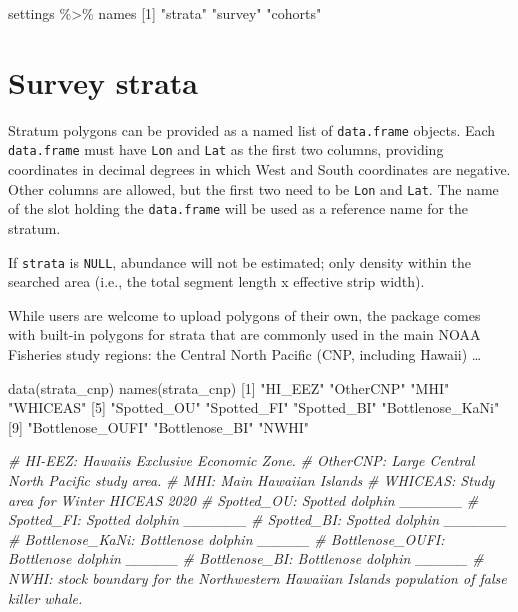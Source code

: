 \documentclass[
]{book}
\newenvironment{Shaded}{\begin{snugshade}}{\end{snugshade}}
\newcommand{\CommentTok}[1]{\textcolor[rgb]{0.56,0.35,0.01}{\textit{#1}}}
\newcommand{\DecValTok}[1]{\textcolor[rgb]{0.00,0.00,0.81}{#1}}
\newcommand{\FunctionTok}[1]{\textcolor[rgb]{0.00,0.00,0.00}{#1}}
\newcommand{\NormalTok}[1]{#1}
\newcommand{\SpecialCharTok}[1]{\textcolor[rgb]{0.00,0.00,0.00}{#1}}
\newcommand{\StringTok}[1]{\textcolor[rgb]{0.31,0.60,0.02}{#1}}
\begin{document}
\begin{Shaded}
\begin{Highlighting}[]
\NormalTok{settings }\SpecialCharTok{\%\textgreater{}\%}\NormalTok{ names}
\NormalTok{[}\DecValTok{1}\NormalTok{] }\StringTok{"strata"}  \StringTok{"survey"}  \StringTok{"cohorts"}
\end{Highlighting}
\end{Shaded}

\hypertarget{survey-strata}{%
\section*{Survey strata}\label{survey-strata}}

Stratum polygons can be provided as a named list of \texttt{data.frame} objects. Each \texttt{data.frame} must have \texttt{Lon} and \texttt{Lat} as the first two columns, providing coordinates in decimal degrees in which West and South coordinates are negative. Other columns are allowed, but the first two need to be \texttt{Lon} and \texttt{Lat}. The name of the slot holding the \texttt{data.frame} will be used as a reference name for the stratum.

If \texttt{strata} is \texttt{NULL}, abundance will not be estimated; only density within the searched area (i.e., the total segment length x effective strip width).

While users are welcome to upload polygons of their own, the package comes with built-in polygons for strata that are commonly used in the main NOAA Fisheries study regions: the Central North Pacific (CNP, including Hawaii) \ldots{}

\begin{Shaded}
\begin{Highlighting}[]
\FunctionTok{data}\NormalTok{(strata\_cnp) }
\FunctionTok{names}\NormalTok{(strata\_cnp)}
\NormalTok{ [}\DecValTok{1}\NormalTok{] }\StringTok{"HI\_EEZ"}          \StringTok{"OtherCNP"}        \StringTok{"MHI"}             \StringTok{"WHICEAS"}        
\NormalTok{ [}\DecValTok{5}\NormalTok{] }\StringTok{"Spotted\_OU"}      \StringTok{"Spotted\_FI"}      \StringTok{"Spotted\_BI"}      \StringTok{"Bottlenose\_KaNi"}
\NormalTok{ [}\DecValTok{9}\NormalTok{] }\StringTok{"Bottlenose\_OUFI"} \StringTok{"Bottlenose\_BI"}   \StringTok{"NWHI"}           

\CommentTok{\# HI{-}EEZ: Hawaii\textquotesingle{}s Exclusive Economic Zone.}
\CommentTok{\# OtherCNP: Large Central North Pacific study area.}
\CommentTok{\# MHI: Main Hawaiian Islands}
\CommentTok{\# WHICEAS: Study area for Winter HICEAS 2020}
\CommentTok{\# Spotted\_OU: Spotted dolphin \_\_\_\_\_\_}
\CommentTok{\# Spotted\_FI: Spotted dolphin \_\_\_\_\_\_}
\CommentTok{\# Spotted\_BI: Spotted dolphin \_\_\_\_\_\_}
\CommentTok{\# Bottlenose\_KaNi: Bottlenose dolphin \_\_\_\_\_}
\CommentTok{\# Bottlenose\_OUFI: Bottlenose dolphin \_\_\_\_\_}
\CommentTok{\# Bottlenose\_BI: Bottlenose dolphin \_\_\_\_\_}
\CommentTok{\# NWHI: stock boundary for the Northwestern Hawaiian Islands population of false killer whale. }
\end{Highlighting}
\end{Shaded}
\end{document}
